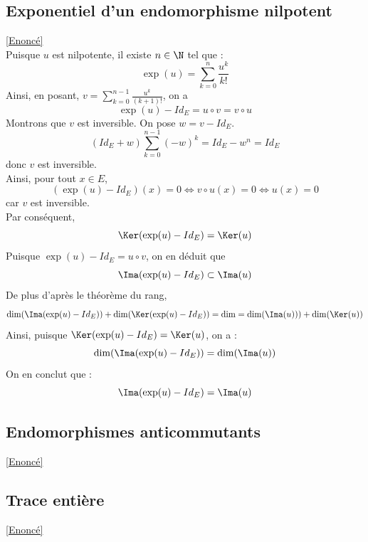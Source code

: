 \documentclass[8pt]{book}
\begin{document}
	\subsection{Exponentiel d'un endomorphisme nilpotent}
	\label{Exponentiel d'un endomorphisme nilpotent corrigé}
	\textcolor{blue}{\hyperref[Exponentiel d'un endomorphisme nilpotent]{[Enoncé]}}\\
	Puisque $u$ est nilpotente, il existe $n\in\N$ tel que :
	\[\exp(u)=\sum_{k=0}^{n}\frac{u^k}{k!}\]
	Ainsi, en posant, $v=\sum_{k=0}^{n-1}\frac{u^{k}}{(k+1)!}$, on a 
	\[\exp(u)-Id_E=u\circ v=v\circ u\]
	Montrons que $v$ est inversible.
	On pose $w=v-Id_E$.\\
	\[(Id_E+w)\sum_{k=0}^{n-1}(-w)^k=Id_E-w^n=Id_E\]
	donc $v$ est inversible.\\
	Ainsi, pour tout $x\in E$,
	\[(\exp(u)-Id_E)(x)=0\Leftrightarrow v\circ u(x)=0\Leftrightarrow u(x)=0\]
	car $v$ est inversible.\\
	Par conséquent, \[\Ker(\exp(u)-Id_E)=\Ker(u)\]
	Puisque $\exp(u)-Id_E=u\circ v$, on en déduit que \[\Ima(\exp(u)-Id_E)\subset\Ima(u)\]
	De plus d'après le théorème du rang, \[\dim(\Ima(\exp(u)-Id_E))+\dim(\Ker(\exp(u)-Id_E))=\dim=\dim(\Ima(u)))+\dim(\Ker(u))\]
	Ainsi, puisque $\Ker(\exp(u)-Id_E)=\Ker(u)$, on a :
	\[\dim(\Ima(\exp(u)-Id_E))=\dim(\Ima(u))\]
	On en conclut que : \[\Ima(\exp(u)-Id_E)=\Ima(u)\]
	
	\subsection{Endomorphismes anticommutants}
	\label{Endomorphimes anticommutants corrigé}
	\textcolor{blue}{\hyperref[Endomorphismes anticommutants]{[Enoncé]}}\\
	
	\subsection{Trace entière}
	\label{Trace entière corrigé}
	\textcolor{blue}{\hyperref[Trace entière]{[Enoncé]}}\\
	
\end{document}
